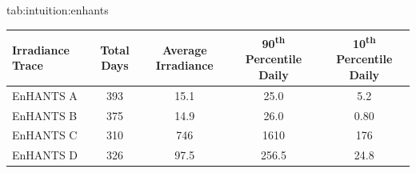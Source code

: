 \begin{definetable*}{tab:intuition:enhants}
            \small
            \begin{tabularx}{\columnwidth}{l | S[table-format=3] | S[table-format=3.1] | S[table-format=4.1] | S[table-format=3.1] }
                Irradiance Trace & {Total Days} & {Average Irradiance} & {90\textsuperscript{th} Percentile Daily} & {10\textsuperscript{th} Percentile Daily} \\ 
                \hline
                EnHANTS A   & 393  & 15.1     & 25.0      & 5.2\\
                EnHANTS B   & 375  & 14.9     & 26.0      & 0.80\\
                EnHANTS C   & 310  & 746      & 1610      & 176\\
                EnHANTS D   & 326  & 97.5     & 256.5     & 24.8\\
            \end{tabularx}
            \caption{Summary statistics for the indoor photovoltaic irradiance traces from the EnHANTs dataset~\cite{gorlatova2013networking}.
            Irradiance is expressed in units of 
            }
\end{definetable*}

